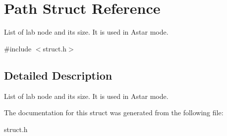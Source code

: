 \hypertarget{struct_path}{}\section{Path Struct Reference}
\label{struct_path}


List of lab node and its size. It is used in Astar mode.  




{\ttfamily \#include $<$struct.\+h$>$}



\subsection{Detailed Description}
List of lab node and its size. It is used in Astar mode. 

The documentation for this struct was generated from the following file\+:\begin{DoxyCompactItemize}
\item 
struct.\+h\end{DoxyCompactItemize}
